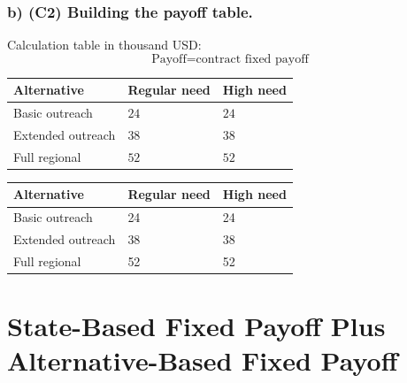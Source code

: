 	
	\subsubsection*{b) \textbf{(C2)} Building the payoff table.}
	\label{subsec:problem9-mobile-clinic-service-contracts-c2}
	Calculation table in thousand USD:
	\[
	\text{Payoff}=\text{contract fixed payoff}
	\]
	\begin{center}
		\begin{tabular}{lll}
			\toprule
			Alternative & Regular need & High need \\
			\midrule
			Basic outreach & $24$ & $24$ \\
			Extended outreach & $38$ & $38$ \\
			Full regional & $52$ & $52$ \\
			\bottomrule
		\end{tabular}
	\end{center}
	
	\begin{center}
		\begin{tabular}{lll}
			\toprule
			Alternative & Regular need & High need \\
			\midrule
			Basic outreach & 24 & 24 \\
			Extended outreach & 38 & 38 \\
			Full regional & 52 & 52 \\
			\bottomrule
		\end{tabular}
	\end{center}
	
	
	\section{State-Based Fixed Payoff Plus Alternative-Based Fixed Payoff}
	\label{sec:state-based-fixed-payoff-plus-alternative-based-fixed-payoff}
	
	
